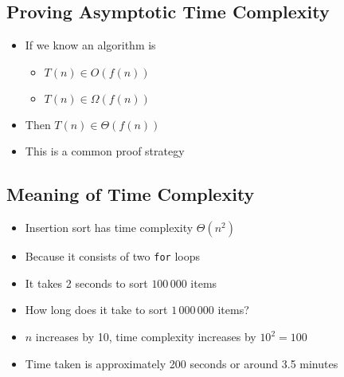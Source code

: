 \begin{slide}
\section{Proving Asymptotic Time Complexity}

\begin{PauseHighLight}
  \begin{itemize}
  \item If we know an algorithm is
    \begin{itemize}
    \item $T(n) \in O(f(n))$
    \item $T(n) \in \Omega(f(n))$\pause
    \end{itemize}
  \item Then $T(n) \in \Theta(f(n))$\pause
  \item This is a common proof strategy\pause
  \end{itemize}
\end{PauseHighLight}

\end{slide}


\begin{slide}
\section{Meaning of Time Complexity}

\begin{PauseHighLight}
  \begin{itemize}
  \item Insertion sort has time complexity $\Theta(n^2)$\pause
  \item Because it consists of two \texttt{for} loops\pause
  \item It takes 2 seconds to sort $100\,000$ items\pause
  \item How long does it take to sort $1\,000\,000$ items?\pause
  \item $n$ increases by 10, time complexity increases by
    $10^2=100$\pauseb
  \item Time taken is approximately 200 seconds or around 3.5
    minutes\pauseb
  \end{itemize}
\end{PauseHighLight}

\end{slide}


